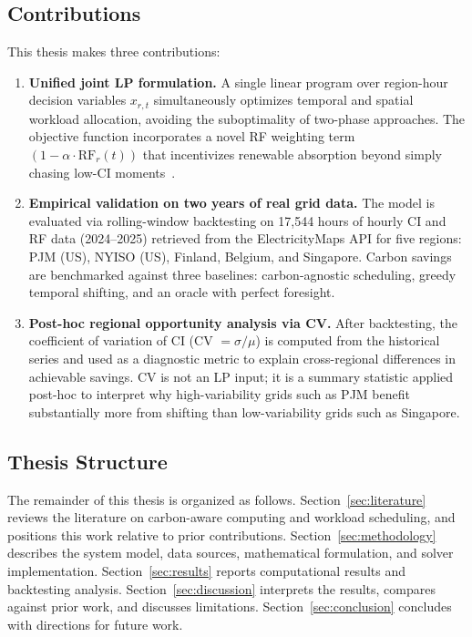 \subsection{Contributions}

This thesis makes three contributions:

\begin{enumerate}[leftmargin=1.5em]
  \item \textbf{Unified joint LP formulation.}
        A single linear program over region-hour decision variables $x_{r,t}$ simultaneously optimizes temporal and spatial workload allocation, avoiding the suboptimality of two-phase approaches.
        The objective function incorporates a novel RF weighting term $(1 - \alpha \cdot \mathrm{RF}_r(t))$ that incentivizes renewable absorption beyond simply chasing low-CI moments~\cite{liu2012}.

  \item \textbf{Empirical validation on two years of real grid data.}
        The model is evaluated via rolling-window backtesting on 17,544 hours of hourly CI and RF data (2024--2025) retrieved from the ElectricityMaps API for five regions: PJM (US), NYISO (US), Finland, Belgium, and Singapore.
        Carbon savings are benchmarked against three baselines: carbon-agnostic scheduling, greedy temporal shifting, and an oracle with perfect foresight.

  \item \textbf{Post-hoc regional opportunity analysis via CV.}
        After backtesting, the coefficient of variation of CI (CV $= \sigma/\mu$) is computed from the historical series and used as a diagnostic metric to explain cross-regional differences in achievable savings.
        CV is not an LP input; it is a summary statistic applied post-hoc to interpret why high-variability grids such as PJM benefit substantially more from shifting than low-variability grids such as Singapore.
\end{enumerate}

\subsection{Thesis Structure}

The remainder of this thesis is organized as follows.
Section~\ref{sec:literature} reviews the literature on carbon-aware computing and workload scheduling, and positions this work relative to prior contributions.
Section~\ref{sec:methodology} describes the system model, data sources, mathematical formulation, and solver implementation.
Section~\ref{sec:results} reports computational results and backtesting analysis.
Section~\ref{sec:discussion} interprets the results, compares against prior work, and discusses limitations.
Section~\ref{sec:conclusion} concludes with directions for future work.
